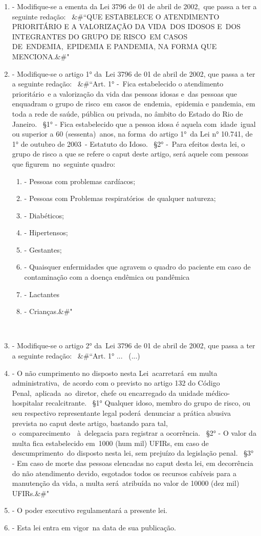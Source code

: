 \documentclass[10pt]{article}
\begin{document}
\begin{enumerate}[label=Art. \arabic*\textdegree]
\item - Modifique-se a ementa da Lei 3796 de 01 de abril de 2002, que passa a ter a seguinte redação: 
&#``QUE ESTABELECE O ATENDIMENTO PRIORITÁRIO E A VALORIZAÇÃO DA VIDA DOS IDOSOS E DOS INTEGRANTES DO GRUPO DE RISCO EM CASOS DE ENDEMIA, EPIDEMIA E PANDEMIA, NA FORMA QUE MENCIONA.&#" 
 
\item - Modifique-se o artigo 1° da Lei 3796 de 01 de abril de 2002, que passa a ter a seguinte redação: 
&#``Art. 1° - Fica estabelecido o atendimento prioritário e a valorização da vida das pessoas idosas e das pessoas que enquadram o grupo de risco em casos de endemia, epidemia e pandemia, em toda a rede de saúde, pública ou privada, no âmbito do Estado do Rio de Janeiro. 
§1° - Fica estabelecido que a pessoa idosa é aquela com idade igual ou superior a 60 (sessenta) anos, na forma do artigo 1° da Lei n° 10.741, de 1° de outubro de 2003 - Estatuto do Idoso. 
§2° - Para efeitos desta lei, o grupo de risco a que se refere o caput deste artigo, será aquele com pessoas que figurem no seguinte quadro: 
\begin{enumerate}[label=\Roman*]
\item - Pessoas com problemas cardíacos; 
\item - Pessoas com Problemas respiratórios de qualquer natureza; 
\item - Diabéticos; 
\item - Hipertensos; 
\item - Gestantes; 
\item - Quaisquer enfermidades que agravem o quadro do paciente em caso de contaminação com a doença endêmica ou pandêmica 
\item - Lactantes 
\item - Crianças.&#" 
\end{enumerate}
 
\item - Modifique-se o artigo 2° da Lei 3796 de 01 de abril de 2002, que passa a ter a seguinte redação: 
&#``Art. 1° ... 
(...) 
\item - O não cumprimento no disposto nesta Lei acarretará em multa administrativa, de acordo com o previsto no artigo 132 do Código Penal, aplicada ao diretor, chefe ou encarregado da unidade médico-hospitalar recalcitrante. 
§1° Qualquer idoso, membro do grupo de risco, ou seu respectivo representante legal poderá denunciar a prática abusiva prevista no caput deste artigo, bastando para tal, o comparecimento  à delegacia para registrar a ocorrência. 
§2° - O valor da multa fica estabelecido em 1000 (hum mil) UFIRs, em caso de descumprimento do disposto nesta lei, sem prejuízo da legislação penal. 
§3° - Em caso de morte das pessoas elencadas no caput desta lei, em decorrência do não atendimento devido, esgotados todos os recursos cabíveis para a manutenção da vida, a multa será atribuída no valor de 10000 (dez mil) UFIRs.&#" 
 
\item - O poder executivo regulamentará a presente lei. 
 
\item - Esta lei entra em vigor na data de sua publicação. 
 

\end{enumerate}
\end{document}
